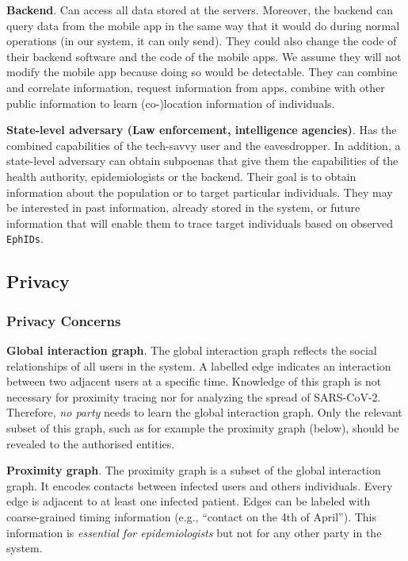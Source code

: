\documentclass[10.8pt,a4paper]{article}
\begin{document}
\textbf{Backend}. Can access all data stored at the servers. Moreover, the backend can query data from the mobile app in the same way that it would do during normal operations (in our system, it can only send). They could also change the code of their backend software and the code of the mobile apps. We assume they will not modify the mobile app because doing so would be detectable. They can combine and correlate information, request information from apps, combine with other public information to learn (co-)location information of individuals.

\textbf{State-level adversary (Law enforcement, intelligence agencies)}. Has the combined
capabilities of the tech-savvy user and the eavesdropper. In addition, a state-level adversary can obtain subpoenas that give them the capabilities of the health authority, epidemiologists or the backend. Their goal is to obtain information about the population or to target particular individuals. They may be interested in past information, already stored in the system, or future information that will enable them to trace target individuals based on observed \texttt{EphIDs}.
\subsection{Privacy}

\subsubsection{Privacy Concerns}
\textbf{Global interaction graph}. The global interaction graph reflects the social relationships of all users in the system. A labelled edge indicates an interaction between two adjacent users at a specific time. Knowledge of this graph is not necessary for proximity tracing nor for analyzing the spread of SARS-CoV-2. Therefore, \textit{no party} needs to learn the global interaction graph. Only the relevant subset of this graph, such as for example the proximity graph (below), should be revealed to the authorised entities.

\textbf{Proximity graph}. The proximity graph is a subset of the global interaction graph. It encodes contacts between infected users and others individuals. Every edge is adjacent to at least one infected patient. Edges can be labeled with coarse-grained timing information (e.g., “contact on the 4th of April”). This information is \textit{essential for epidemiologists} but not for any other party in the system.
\end{document}
